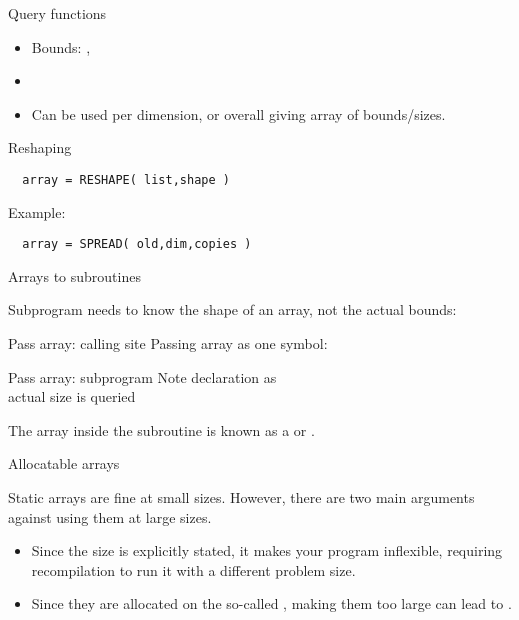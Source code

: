 \begin{slide}{Query functions}
  \label{sl:farray-query}
  \begin{itemize}
  \item Bounds: , 
  \item {}
  \item Can be used per dimension, or overall giving array of bounds/sizes.
  \end{itemize}
\end{slide}

 {Reshaping}

\begin{verbatim}
  array = RESHAPE( list,shape )
\end{verbatim}
Example:

\begin{verbatim}
  array = SPREAD( old,dim,copies )
\end{verbatim}

 {Arrays to subroutines}

Subprogram needs to know the shape of an array, not the actual bounds:

\begin{block}{Pass array: calling site}
  \label{sl:farray-pass1d-main}
  Passing array as one symbol:
\end{block}

\begin{block}{Pass array: subprogram}
  \label{sl:farray-pass1d-subr}
  Note declaration as \\
  actual size is queried
\end{block}

The array inside the subroutine is known as a
 or
.

 {Allocatable arrays}
\label{sec:allocatable}

Static arrays are fine at small sizes. However, 
there are two main arguments against using them at large sizes.
\begin{itemize}
\item Since the size is explicitly stated, it makes your program
  inflexible, requiring recompilation to run it with a different
  problem size.
\item Since they are allocated on the so-called ,
  making them too large can lead to .
\end{itemize}

